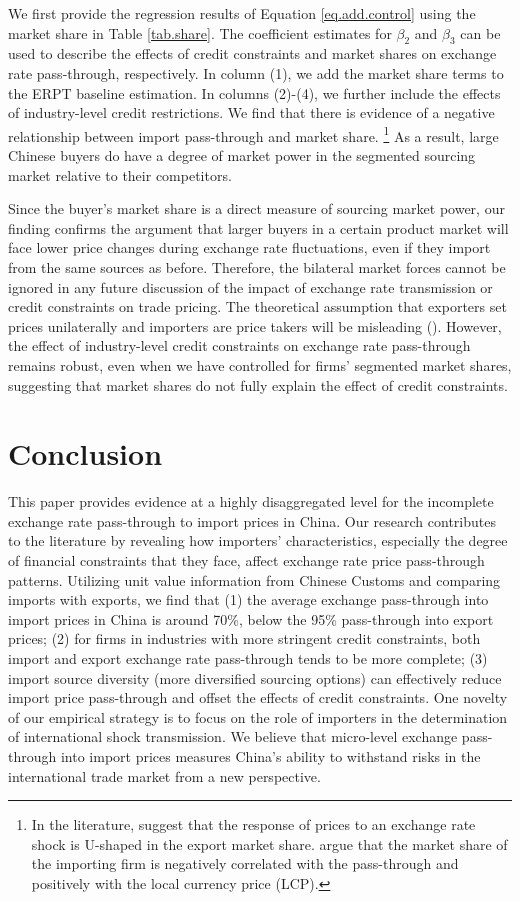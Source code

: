 We first provide the regression results of Equation \ref{eq.add.control} using the market share in Table \ref{tab.share}. The coefficient estimates for $\beta_2$ and $\beta_3$ can be used to describe the effects of credit constraints and market shares on exchange rate pass-through, respectively. In column (1), we add the market share terms to the ERPT baseline estimation. In columns (2)-(4), we further include the effects of industry-level credit restrictions. We find that there is evidence of a negative relationship between import pass-through and market share. \footnote{In the literature, \cite{auer2016} suggest that the response of prices to an exchange rate shock is U-shaped in the export market share. \cite{devereux2017} argue that the market share of the importing firm is negatively correlated with the pass-through and positively with the local currency price (LCP).} As a result, large Chinese buyers do have a degree of market power in the segmented sourcing market relative to their competitors.

Since the buyer's market share is a direct measure of sourcing market power, our finding confirms the argument that larger buyers in a certain product market will face lower price changes during exchange rate fluctuations, even if they import from the same sources as before. Therefore, the bilateral market forces cannot be ignored in any future discussion of the impact of exchange rate transmission or credit constraints on trade pricing. The theoretical assumption that exporters set prices unilaterally and importers are price takers will be misleading (\cite{alviarez2023}). However, the effect of industry-level credit constraints on exchange rate pass-through remains robust, even when we have controlled for firms' segmented market shares, suggesting that market shares do not fully explain the effect of credit constraints.

\section{Conclusion}\label{Conclusion}

This paper provides evidence at a highly disaggregated level for the incomplete exchange rate pass-through to import prices in China. Our research contributes to the literature by revealing how importers' characteristics, especially the degree of financial constraints that they face, affect exchange rate price pass-through patterns. Utilizing unit value information from Chinese Customs and comparing imports with exports, we find that (1) the average exchange pass-through into import prices in China is around 70\%, below the 95\% pass-through into export prices; (2) for firms in industries with more stringent credit constraints, both import and export exchange rate pass-through tends to be more complete; (3) import source diversity (more diversified sourcing options) can effectively reduce import price pass-through and offset the effects of credit constraints. One novelty of our empirical strategy is to focus on the role of importers in the determination of international shock transmission. We believe that micro-level exchange pass-through into import prices measures China's ability to withstand risks in the international trade market from a new perspective.

